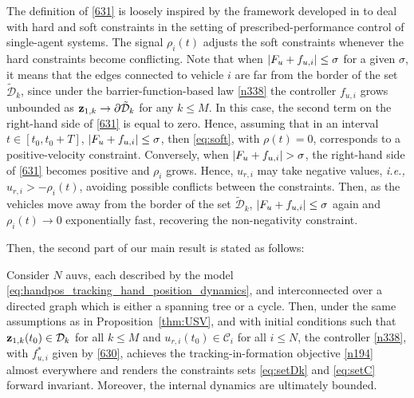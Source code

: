 \begin{rmk}
	The definition of \eqref{631} is loosely inspired by the framework developed in \cite{mehdifar2022funnel} to deal with hard and soft constraints in the setting of prescribed-performance control of single-agent systems.
	The signal $\rho_i(t)$ adjusts the soft constraints whenever the hard constraints become conflicting. 
	Note that when $\left|F_{u}+f_{u, i}\right|\leq \sigma$ for a given $\sigma$, it means that the edges connected to vehicle $i$ are far from the border of the set $\tilde{\mathcal{D}}_k$, since under the barrier-function-based law \eqref{n338} the controller $f_{u, i}$ grows unbounded as $\mathbf{z}_{1, k}\rightarrow\partial\tilde{\mathcal{D}}_k$ for any $k\leq M$.
	In this case, the second term on the right-hand side of \eqref{631} is equal to zero. Hence, assuming that in an interval $t\in[t_0,t_0+T]$, $\left|F_{u}+f_{u, i}\right|\leq \sigma$, then \eqref{eq:soft}, with $\rho(t)=0$, corresponds to a positive-velocity constraint.
	Conversely, when $\abs{F_{u}+f_{u, i}}>\sigma$, the right-hand side of \eqref{631} becomes positive and $\rho_i$ grows. Hence, $u_{r, i}$ may take negative values, \emph{i.e.,} $u_{r, i}>-\rho_i(t)$, avoiding possible conflicts between the constraints. Then, as the vehicles move away from the border of the set $\tilde{\mathcal{D}}_k$, $\left|F_{u}+f_{u, i}\right|\leq\sigma$ again and $\rho_i(t)\rightarrow0$ exponentially fast, recovering the non-negativity constraint.
\end{rmk}

Then, the second part of our main result is stated as follows:
\begin{prop}\label{thm:USV-2}
	Consider $N$ \glspl{auv}, each described by the model \eqref{eq:handpos_tracking_hand_position_dynamics}, and interconnected over a directed graph which is either a spanning tree or a cycle.
	Then, under the same assumptions as in Proposition~\ref{thm:USV}, and with initial conditions such that $\mathbf{z}_{1, k}(t_0)\in\mathcal{D}_k$ for all $k\leq M$ and $u_{r, i}(t_0)\in\mathcal{C}_i$ for all $i\leq N$, the controller \eqref{n338}, with $f_{u, i}^*$ given by \eqref{630}, achieves the tracking-in-formation objective \eqref{n194} almost everywhere and renders the constraints sets \eqref{eq:setDk} and \eqref{eq:setC} forward invariant.
	Moreover, the internal dynamics are ultimately bounded.
\end{prop}

